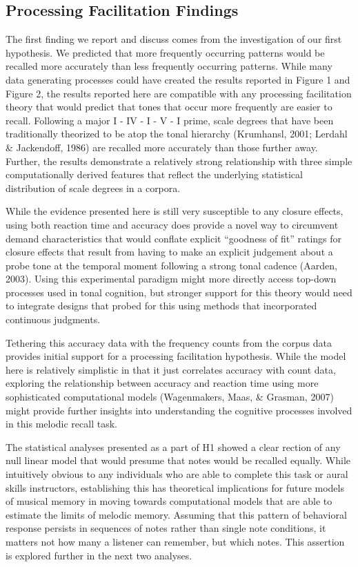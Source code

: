 \documentclass[english,man]{apa6}
\begin{document}
\hypertarget{processing-facilitation-findings}{%
\subsection{Processing Facilitation Findings}\label{processing-facilitation-findings}}

The first finding we report and discuss comes from the investigation of our first hypothesis.
We predicted that more frequently occurring patterns would be recalled more accurately than less frequently occurring patterns.
While many data generating processes could have created the results reported in Figure 1 and Figure 2, the results reported here are compatible with any processing facilitation theory that would predict that tones that occur more frequently are easier to recall.
Following a major I - IV - I - V - I prime, scale degrees that have been traditionally theorized to be atop the tonal hierarchy (Krumhansl, 2001; Lerdahl \& Jackendoff, 1986) are recalled more accurately than those further away.
Further, the results demonstrate a relatively strong relationship with three simple computationally derived features that reflect the underlying statistical distribution of scale degrees in a corpora.

While the evidence presented here is still very susceptible to any closure effects, using both reaction time and accuracy does provide a novel way to circumvent demand characteristics that would conflate explicit \enquote{goodness of fit} ratings for closure effects that result from having to make an explicit judgement about a probe tone at the temporal moment following a strong tonal cadence (Aarden, 2003).
Using this experimental paradigm might more directly access top-down processes used in tonal cognition, but stronger support for this theory would need to integrate designs that probed for this using methods that incorporated continuous judgments.

Tethering this accuracy data with the frequency counts from the corpus data provides initial support for a processing facilitation hypothesis.
While the model here is relatively simplistic in that it just correlates accuracy with count data, exploring the relationship between accuracy and reaction time using more sophisticated computational models (Wagenmakers, Maas, \& Grasman, 2007) might provide further insights into understanding the cognitive processes involved in this melodic recall task.

The statistical analyses presented as a part of H1 showed a clear rection of any null linear model that would presume that notes would be recalled equally.
While intuitively obvious to any individuals who are able to complete this task or aural skills instructors, establishing this has theoretical implications for future models of musical memory in moving towards computational models that are able to estimate the limits of melodic memory.
Assuming that this pattern of behavioral response persists in sequences of notes rather than single note conditions, it matters not how many a listener can remember, but which notes.
This assertion is explored further in the next two analyses.
\end{document}
